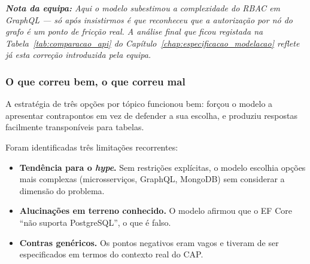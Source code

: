 
\noindent\textit{\textbf{Nota da equipa:} Aqui o modelo subestimou a complexidade do RBAC em GraphQL --- só após insistirmos é que reconheceu que a autorização por nó do grafo é um ponto de fricção real. A análise final que ficou registada na Tabela~\ref{tab:comparacao_api} do Capítulo~\ref{chap:especificacao_modelacao} reflete já esta correção introduzida pela equipa.}

\subsubsection*{O que correu bem, o que correu mal}

A estratégia de três opções por tópico funcionou bem: forçou o modelo a apresentar contrapontos em vez de defender a sua escolha, e produziu respostas facilmente transponíveis para tabelas.

Foram identificadas três limitações recorrentes:

\begin{itemize}
    \item \textbf{Tendência para o \textit{hype}.} Sem restrições explícitas, o modelo escolhia opções mais complexas (microsserviços, GraphQL, MongoDB) sem considerar a dimensão do problema.
    \item \textbf{Alucinações em terreno conhecido.} O modelo afirmou que o EF Core ``não suporta PostgreSQL'', o que é falso.
    \item \textbf{Contras genéricos.} Os pontos negativos eram vagos e tiveram de ser especificados em termos do contexto real do CAP.
\end{itemize}

